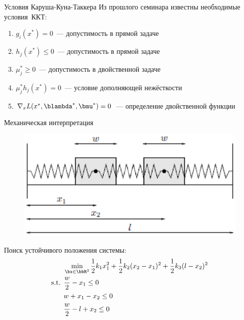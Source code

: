 \documentclass[12pt,russian]{beamer}
\begin{document}
\begin{frame}{Условия Каруша-Куна-Таккера}
Из прошлого семинара известны необходимые условия~ККТ: 
\begin{enumerate}
\item $g_i(x^*) = 0$~--- допустимость в прямой задаче
\item $h_j(x^*) \leq 0$~--- допустимость в прямой задаче
\item $ \mu^*_j \geq 0$~--- допустимость в двойственной задаче
\item $\mu^*_jh_j(x^*) = 0$~--- условие дополняющей нежёсткости
\item $\nabla_x L(x^*, \blambda^*, \bmu^*) = 0$~--- определение двойственной функции
\end{enumerate}

\end{frame}

\begin{frame}{Механическая интерпретация}
\begin{figure}
\centering
\includegraphics[scale=0.5]{kkt_mechanics.eps}
\end{figure}
Поиск устойчивого положения системы:
\begin{equation*}
\begin{split}
& \min_{\bx \in \bbR^3} \frac{1}{2}k_1x_1^2 + \frac{1}{2}k_2(x_2 - x_1)^2 + \frac{1}{2}k_3 (l - x_2)^2\\
\text{s.t. } & \frac{w}{2} - x_1 \leq 0\\
& w + x_1 - x_2 \leq 0\\
& \frac{w}{2} - l + x_2 \leq 0
\end{split}
\end{equation*}

\end{frame}
\end{document}
